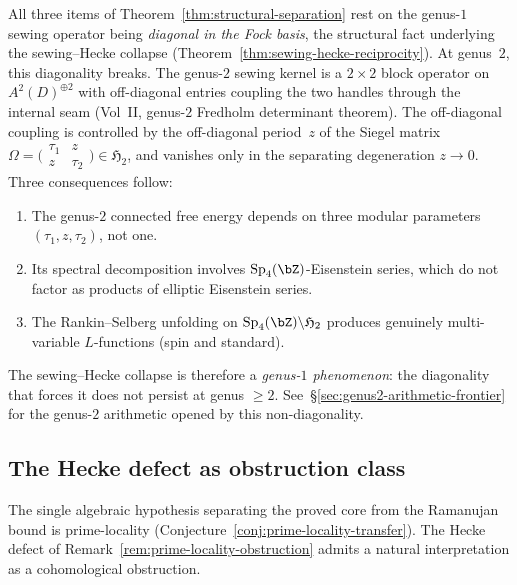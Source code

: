 \begin{remark}%
\label{rem:genus2-escape-route}%
%
All three items of Theorem~\ref{thm:structural-separation}
rest on the genus-$1$ sewing operator being
\emph{diagonal in the Fock basis}, the structural fact
underlying the sewing--Hecke collapse
(Theorem~\ref{thm:sewing-hecke-reciprocity}).
At genus~$2$, this diagonality breaks.
The genus-$2$ sewing kernel is a $2 \times 2$ block operator
on $A^2(D)^{\oplus 2}$ with off-diagonal entries coupling
the two handles through the internal seam
(Vol~II, genus-$2$ Fredholm determinant theorem).
The off-diagonal coupling is controlled by the
off-diagonal period~$z$ of the Siegel matrix
$\Omega = \bigl(\begin{smallmatrix}\tau_1 & z \\
z & \tau_2\end{smallmatrix}\bigr)
\in \mathfrak{H}_2$, and vanishes only in the separating
degeneration $z \to 0$. Three consequences follow:
\begin{enumerate}[label=\textup{(\roman*)}]
\item The genus-$2$ connected free energy depends on
 three modular parameters $(\tau_1, z, \tau_2)$, not one.
\item Its spectral decomposition involves
 $\mathrm{Sp}_4(\bZ)$-Eisenstein series, which do not
 factor as products of elliptic Eisenstein series.
\item The Rankin--Selberg unfolding on
 $\mathrm{Sp}_4(\bZ) \backslash \mathfrak{H}_2$
 produces genuinely multi-variable $L$-functions (spin
 and standard).
\end{enumerate}
The sewing--Hecke collapse is therefore a \emph{genus-$1$
phenomenon}: the diagonality that forces it does not persist
at genus $\geq 2$. See~\S\ref{sec:genus2-arithmetic-frontier}
for the genus-$2$ arithmetic opened by this non-diagonality.
\end{remark}

\subsection{The Hecke defect as obstruction class}%
\label{subsec:hecke-defect-obstruction}%

The single algebraic hypothesis separating the proved core
from the Ramanujan bound is prime-locality
(Conjecture~\ref{conj:prime-locality-transfer}).
The Hecke defect of
Remark~\ref{rem:prime-locality-obstruction} admits a natural
interpretation as a cohomological obstruction.


